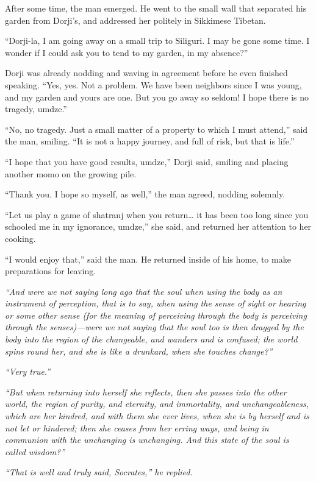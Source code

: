 After some time, the man emerged. He went to the small wall that
separated his garden from Dorji's, and addressed her politely in
Sikkimese Tibetan.

``Dorji-la, I am going away on a small trip to Siliguri. I may be gone
some time. I wonder if I could ask you to tend to my garden, in my
absence?''

Dorji was already nodding and waving in agreement before he even
finished speaking. ``Yes, yes. Not a problem. We have been neighbors
since I was young, and my garden and yours are one. But you go away so
seldom! I hope there is no tragedy, umdze.''

``No, no tragedy. Just a small matter of a property to which I must
attend,'' said the man, smiling. ``It is not a happy journey, and full
of risk, but that is life.''

``I hope that you have good results, umdze,'' Dorji said, smiling and
placing another momo on the growing pile.

``Thank you. I hope so myself, as well,'' the man agreed, nodding
solemnly.

``Let us play a game of shatranj when you return\ldots{} it has been too
long since you schooled me in my ignorance, umdze,'' she said, and
returned her attention to her cooking.

``I would enjoy that,'' said the man. He returned inside of his home, to
make preparations for leaving.

\mybreak

\emph{``And were we not saying long ago that the soul when using the
body as an instrument of perception, that is to say, when using the
sense of sight or hearing or some other sense (for the meaning of
perceiving through the body is perceiving through the senses)---were we
not saying that the soul too is then dragged by the body into the region
of the changeable, and wanders and is confused; the world spins round
her, and she is like a drunkard, when she touches change?''}

\emph{``Very true.''}

\emph{``But when returning into herself she reflects, then she passes
into the other world, the region of purity, and eternity, and
immortality, and unchangeableness, which are her kindred, and with them
she ever lives, when she is by herself and is not let or hindered; then
she ceases from her erring ways, and being in communion with the
unchanging is unchanging. And this state of the soul is called
wisdom?''}

\emph{``That is well and truly said, Socrates,'' he replied.}

